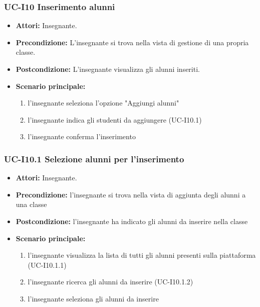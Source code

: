 \subsubsection{UC-I10 Inserimento alunni}
\begin{itemize}
	\item \textbf{Attori:} Insegnante.
	\item \textbf{Precondizione:} L'insegnante si trova nella vista di gestione di una propria classe.
	\item \textbf{Postcondizione:} L'insegnante visualizza gli alunni inseriti.
	\item \textbf{Scenario principale:}
	\begin{enumerate}
		\item l'insegnante seleziona l'opzione "Aggiungi alunni"
		\item l'insegnante indica gli studenti da aggiungere (UC-I10.1)
		\item l'insegnante conferma l'inserimento
	\end{enumerate}
\end{itemize}

\subsubsection{UC-I10.1 Selezione alunni per l'inserimento}
\begin{itemize}
	\item \textbf{Attori:} Insegnante.
	\item \textbf{Precondizione:} l'insegnante si trova nella vista di aggiunta degli alunni a una classe
	\item \textbf{Postcondizione:} l'insegnante ha indicato gli alunni da inserire nella classe
	\item \textbf{Scenario principale:}
	\begin{enumerate}
		\item l'insegnante visualizza la lista di tutti gli alunni presenti sulla piattaforma (UC-I10.1.1)
		\item l'insegnante ricerca gli alunni da inserire (UC-I10.1.2)	
		\item l'insegnante seleziona gli alunni da inserire
	\end{enumerate}
\end{itemize}

